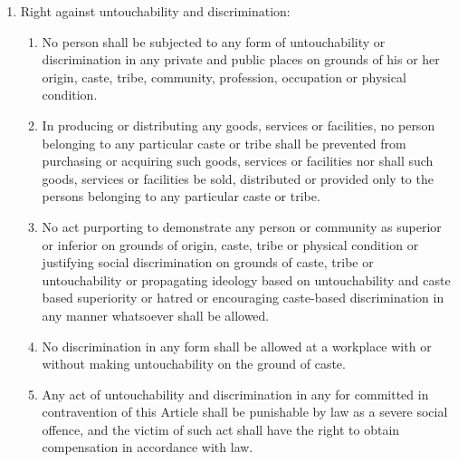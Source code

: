 \begin{questions}
\begin{solution}
\begin{enumerate}
\item Right against untouchability and discrimination:
\begin{enumerate}
    \item No person shall be subjected to any form of untouchability or discrimination in any private and public places on grounds of his or her origin, caste, tribe, community, profession, occupation or physical condition.
    \item In producing or distributing any goods, services or facilities, no person belonging to any particular caste or tribe shall be prevented from purchasing or acquiring such goods, services or facilities nor shall such goods, services or facilities be sold, distributed or provided only to the persons belonging to any particular caste or tribe.
    \item No act purporting to demonstrate any person or community as superior or inferior on grounds of origin, caste, tribe or physical condition or justifying social discrimination on grounds of caste, tribe or untouchability or propagating ideology based on untouchability and caste based superiority or hatred or encouraging caste-based discrimination in any manner whatsoever shall be allowed.
    \item No discrimination in any form shall be allowed at a workplace with or without making untouchability on the ground of caste.
    \item Any act of untouchability and discrimination in any for committed in contravention of this Article shall be punishable by law as a severe social offence, and the victim of such act shall have the right to obtain compensation in accordance with law.
\end{enumerate}


\end{enumerate}
\end{solution}
\end{questions}
